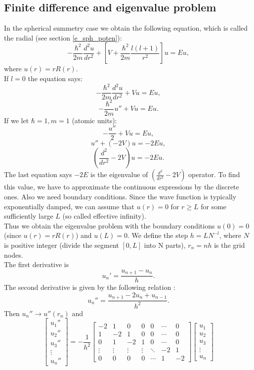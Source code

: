 \documentclass[a4paper, 12pt]{article}
\begin{document}
\subsection{Finite difference and eigenvalue problem} \label{sec:numerical}
In the spherical summetry case we obtain the following equation, which is called the radial (see section \ref{e_sph_poten}): 
$$-\frac{\hbar^2}{2m}\frac{d^2 u}{d r^2}+[V+\frac{\hbar^2}{2m}\frac{l(l+1)}{r^2}]u = Eu,$$
where $u(r) = r R(r).$ \\
If  $l=0$ the equation says:
$$-\frac{\hbar^2}{2m}\frac{d^2 u}{d r^2}+Vu = Eu,$$
$$-\frac{\hbar^2}{2m}u''+Vu = Eu.$$
If we let $\hbar = 1, m=1$ (atomic units):
$$-\frac{u''}{2}+Vu = Eu,$$
$$u'' +(-2V)u = -2Eu,$$
$$(\frac{d^2}{d r^2}-2V)u = -2Eu.$$
The last equation says $-2E$ is the eigenvalue of $(\frac{d^2}{d r^2}-2V)$ operator. To find this value, we have to approximate the continuous expressions by the discrete ones. Also we need boundary conditions. Since the wave function is typically exponentially damped, we can assume that $ u (r) = 0 $ for $ r \geq L $ for some sufficiently large $ L $ (so called effective infinity). \\
Thus we obtain the eigenvalue problem with the boundary conditions $u(0) = 0$ (since $ u (r) = r R (r) $) and $ u (L) = 0 $. We define the step $ h = L N ^{-l}$, where $ N $ is  positive integer (divide the segment $ [0, L] $ into N parts), $ r_n = nh $ is the grid nodes.\\
The first derivative is 
 $$\displaystyle{{u_n'} = \frac{u_{n+1}-u_{n}}{h}}.$$ 
The second derivative is given by the following relation : $$\displaystyle{{u_n''} = \frac{u_{n+1}-2u_n +u_{n-1}}{h^2}}.$$ 
Then $ u_n'' \to u''(r_n)$ and 
$$\displaystyle{
\begin{bmatrix}
u_1'' \\
u_2'' \\
u_3'' \\
\vdots \\
u_n''
\end{bmatrix}
 = -\frac{1}{h^2} \begin{bmatrix}
-2 & 1 &0&0&0& \cdots & 0 \\
1 & -2 & 1& 0&0&\cdots & 0 \\  
0&1 & -2 & 1& 0&\cdots & 0 \\  
\vdots & \vdots &\vdots & \vdots & \ddots & -2& 1  \\
0 & 0&0 &0& \cdots &1 & -2
\end{bmatrix}
\begin{bmatrix}
u_1
\\
u_2
\\
u_3
\\
\vdots
\\
u_n
\end{bmatrix}}$$
\end{document}
